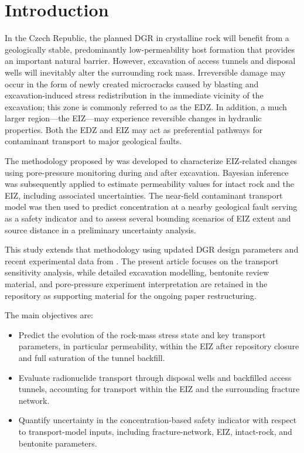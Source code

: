 \section{Introduction}

In the Czech Republic, the planned \Gls{DGR} in crystalline rock will benefit from a geologically stable, predominantly low-permeability host formation that provides an important natural barrier. However, excavation of access tunnels and disposal wells will inevitably alter the surrounding rock mass. Irreversible damage may occur in the form of newly created microcracks caused by blasting and excavation-induced stress redistribution in the immediate vicinity of the excavation; this zone is commonly referred to as the \gls{EDZ}. In addition, a much larger region---the \gls{EIZ}---may experience reversible changes in hydraulic properties. Both the \gls{EDZ} and \gls{EIZ} may act as preferential pathways for contaminant transport to major geological faults.

The methodology proposed by \cite{BrezinaMethodology2023} was developed to characterize \gls{EIZ}-related changes using pore-pressure monitoring during and after excavation. Bayesian inference was subsequently applied to estimate permeability values for intact rock and the \gls{EIZ}, including associated uncertainties. The near-field contaminant transport model was then used to predict concentration at a nearby geological fault serving as a safety indicator and to assess several bounding scenarios of \gls{EIZ} extent and source distance in a preliminary uncertainty analysis.

This study extends that methodology using updated \gls{DGR} design parameters and recent experimental data from \URFB. The present article focuses on the transport sensitivity analysis, while detailed excavation modelling, bentonite review material, and pore-pressure experiment interpretation are retained in the repository as supporting material for the ongoing paper restructuring.

The main objectives are:
\begin{itemize}
    \item Predict the evolution of the rock-mass stress state and key transport parameters, in particular permeability, within the \gls{EIZ} after repository closure and full saturation of the tunnel backfill.
    \item Evaluate radionuclide transport through disposal wells and backfilled access tunnels, accounting for transport within the \gls{EIZ} and the surrounding fracture network.
    \item Quantify uncertainty in the concentration-based safety indicator with respect to transport-model inputs, including fracture-network, \gls{EIZ}, intact-rock, and bentonite parameters.
\end{itemize}
